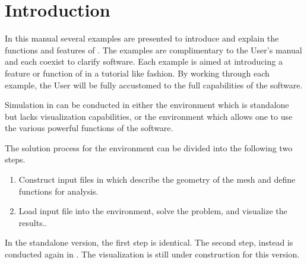 \section{Introduction}
In this manual several examples are presented to 
introduce and explain the functions and features of
. The examples are complimentary to the 
User's manual and each coexist to clarify software.
Each example is aimed at introducing a feature or
function of  in a tutorial like fashion.
By working through each example,  the User will be
fully accustomed to the full capabilities of the 
software.

Simulation in  can be conducted in 
either the  environment which is standalone
but lacks visualization capabilities,
or the  environment which allows one to
use the various powerful functions of the software.

The solution process for the  environment
can be divided into the following two steps.
\begin{enumerate}
\item Construct input files in  which describe
      the geometry of the mesh and define functions for 
      analysis.
\item Load  input file into the 
      environment, solve the problem, and visualize the 
      results..
\end{enumerate}
In the  standalone version, the first step is
identical. The second step, instead is conducted again
in . The visualization is still under construction
for this version.
